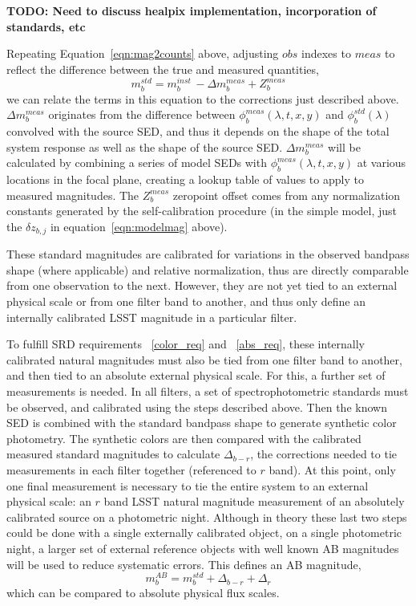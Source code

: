 \documentclass[12pt,preprint]{aastex}
\begin{document}
{\bf TODO: Need to discuss healpix implementation, incorporation of standards, etc}

Repeating Equation~\ref{eqn:mag2counts} above, adjusting ${obs}$ indexes to ${meas}$ to 
reflect the difference between the true and measured quantities,
\begin{equation}
\label{eqn:magsFromCounts}
m_b^{std} = m_b^{inst} \, - \Delta m_b^{meas} + Z_b^{meas} 
\end{equation}
we can relate the terms in this equation to the corrections just
described above.  $\Delta m_b^{meas}$ originates from the difference
between $\phi_b^{meas}(\lambda,t,x,y)$ and $\phi_b^{std}(\lambda)$
convolved with the source SED, and thus it depends on the shape of the total
system response as well as the shape of the source SED. $\Delta
m_b^{meas}$ will be calculated by combining a series of model SEDs
with $\phi_b^{meas}(\lambda,t,x,y)$ at various locations in the focal
plane, creating a lookup table of values to apply to measured
magnitudes.  The $Z_b^{meas}$
zeropoint offset comes from any normalization constants generated by the 
self-calibration procedure (in the simple model, just the $\delta z_{b,j}$ in
equation~\ref{eqn:modelmag} above). 

These standard magnitudes are calibrated for variations in the
observed bandpass shape (where applicable) and relative normalization,
thus are directly comparable from one observation to the
next. However, they are not yet tied to an external physical scale or
from one filter band to another, and thus only define an internally
calibrated LSST magnitude in a particular filter.

To fulfill SRD requirements ~\ref{color_req} and ~\ref{abs_req}, these
internally calibrated natural magnitudes must also be tied from one filter
band to another, and then tied to an absolute external physical scale.
For this, a further set of measurements is needed. In all filters, a
set of spectrophotometric standards must be observed, and calibrated using
the steps described above. Then the known SED is combined with
the standard bandpass shape to generate synthetic color
photometry. The synthetic colors are then compared with the
calibrated measured standard magnitudes to calculate $\Delta_{b-r}$,
the corrections needed to tie measurements in each filter together
(referenced to $r$ band).  At this point, only one final measurement
is necessary to tie the entire system to an external physical scale:
an $r$ band LSST natural magnitude measurement of an absolutely
calibrated source on a photometric night. Although in theory these
last two steps could be done with a single externally calibrated
object, on a single photometric night, a larger set of external
reference objects with well known AB magnitudes will be used to reduce
systematic errors. This defines an AB magnitude,
\begin{equation}
\label{eqn:extmags}
m_b^{AB} = m_b^{std}  + \Delta_{b-r} + \Delta_r
\end{equation}
which can be compared to absolute physical flux scales. 
\end{document}
